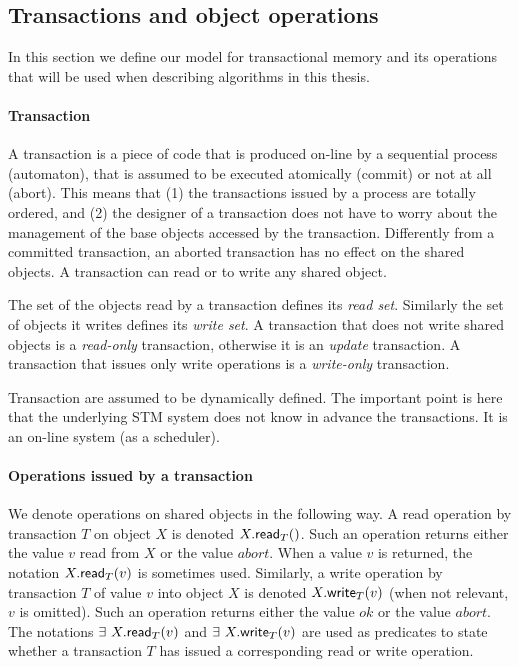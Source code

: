 \subsection{Transactions and object operations}
\label{base-definitions}
In this section we define our model for transactional memory and its operations
that will be used when describing algorithms in this thesis.

\paragraph{Transaction}
A transaction is  a piece of code that is produced  on-line by a sequential
process (automaton), that is assumed to be executed  atomically (commit) or
not  at all  (abort). This  means  that (1)  the transactions  issued by  a
process are totally ordered, and (2) the designer of a transaction does 
not have to  worry about the  management of the  base objects  accessed  
by the transaction.  Differently from  a committed transaction, an aborted  
transaction has no effect on the shared objects. 
A transaction  can read or to write any shared object. 
 

The set of the objects read by a transaction  defines its
{\it read  set}.  Similarly the set  of objects it writes  defines its 
{\it write set}. A transaction that does not  write shared objects is 
a  {\it  read-only}  transaction, otherwise it is an {\it update}
transaction.  A transaction that issues only write operations is 
a {\it write-only}  transaction. 

Transaction are assumed to be dynamically defined. The important point is here 
that the  underlying STM system does not know in advance the transactions. 
It is an  on-line system (as a scheduler).  



\paragraph{Operations issued by a transaction}
We denote operations on shared objects in the following way.
A read operation by transaction $T$ on object $X$ is denoted
$X.{\sf read}_T()$. Such an operation returns either the value $v$ read from 
$X$ or the value $abort$.  When a value $v$ is returned, 
the notation  $X.{\sf read}_T(v)$ is sometimes used.  
%
Similarly, a write operation by transaction $T$ of value $v$ into object 
$X$ is denoted $X.{\sf write}_T(v)$ (when not relevant, $v$ is omitted). 
Such an operation returns either the value $ok$ or the value $abort$. 
%
The notations $\exists~ X.{\sf read}_T(v)$  and $\exists~ X.{\sf write}_T(v)$ 
are  used as  predicates to  state whether a transaction  $T$ has issued a
corresponding read or write operation. 


